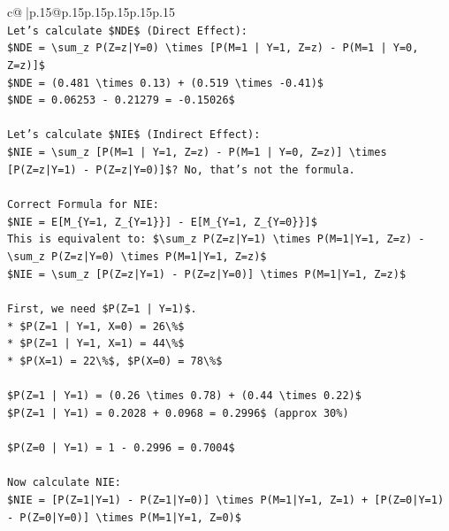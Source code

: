 \documentclass{article}
\begin{document}
{\begin{supertabular}{c@{$\;$}|p{.15\linewidth}@{}p{.15\linewidth}p{.15\linewidth}p{.15\linewidth}p{.15\linewidth}p{.15\linewidth}}
{{{\\ 
\texttt{Let's calculate \$NDE\$ (Direct Effect):} \\
\texttt{\$NDE = \textbackslash{}sum\_z P(Z=z|Y=0) \textbackslash{}times {[}P(M=1 | Y=1, Z=z) {-} P(M=1 | Y=0, Z=z){]}\$} \\
\texttt{\$NDE = (0.481 \textbackslash{}times 0.13) + (0.519 \textbackslash{}times {-}0.41)\$} \\
\texttt{\$NDE = 0.06253 {-} 0.21279 = {-}0.15026\$} \\
\\ 
\texttt{Let's calculate \$NIE\$ (Indirect Effect):} \\
\texttt{\$NIE = \textbackslash{}sum\_z {[}P(M=1 | Y=1, Z=z) {-} P(M=1 | Y=0, Z=z){]} \textbackslash{}times {[}P(Z=z|Y=1) {-} P(Z=z|Y=0){]}\$? No, that's not the formula.} \\
\\ 
\texttt{Correct Formula for NIE:} \\
\texttt{\$NIE = E{[}M\_\{Y=1, Z\_\{Y=1\}\}{]} {-} E{[}M\_\{Y=1, Z\_\{Y=0\}\}{]}\$} \\
\texttt{This is equivalent to: \$\textbackslash{}sum\_z P(Z=z|Y=1) \textbackslash{}times P(M=1|Y=1, Z=z) {-} \textbackslash{}sum\_z P(Z=z|Y=0) \textbackslash{}times P(M=1|Y=1, Z=z)\$} \\
\texttt{\$NIE = \textbackslash{}sum\_z {[}P(Z=z|Y=1) {-} P(Z=z|Y=0){]} \textbackslash{}times P(M=1|Y=1, Z=z)\$} \\
\\ 
\texttt{First, we need \$P(Z=1 | Y=1)\$.} \\
\texttt{*   \$P(Z=1 | Y=1, X=0) = 26\textbackslash{}\%\$} \\
\texttt{*   \$P(Z=1 | Y=1, X=1) = 44\textbackslash{}\%\$} \\
\texttt{*   \$P(X=1) = 22\textbackslash{}\%\$, \$P(X=0) = 78\textbackslash{}\%\$} \\
\\ 
\texttt{\$P(Z=1 | Y=1) = (0.26 \textbackslash{}times 0.78) + (0.44 \textbackslash{}times 0.22)\$} \\
\texttt{\$P(Z=1 | Y=1) = 0.2028 + 0.0968 = 0.2996\$ (approx 30\%)} \\
\\ 
\texttt{\$P(Z=0 | Y=1) = 1 {-} 0.2996 = 0.7004\$} \\
\\ 
\texttt{Now calculate NIE:} \\
\texttt{\$NIE = {[}P(Z=1|Y=1) {-} P(Z=1|Y=0){]} \textbackslash{}times P(M=1|Y=1, Z=1) + {[}P(Z=0|Y=1) {-} P(Z=0|Y=0){]} \textbackslash{}times P(M=1|Y=1, Z=0)\$} \\
}}}
\end{supertabular}}
\end{document}
